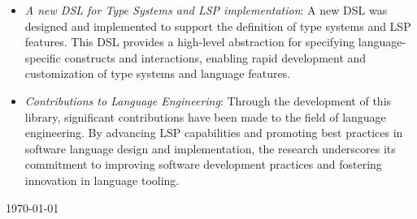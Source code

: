 \documentclass{adapt-lab}
\begin{document}
\begin{itemize}
    \item \textit{A new DSL for Type Systems and LSP implementation}: A new DSL was designed and implemented to support the definition of type systems and LSP features. This DSL provides a high-level abstraction for specifying language-specific constructs and interactions, enabling rapid development and customization of type systems and language features.
    \item \textit{Contributions to Language Engineering}: Through the development of this library, significant contributions have been made to the field of language engineering. By advancing LSP capabilities and promoting best practices in software language design and implementation, the research underscores its commitment to improving software development practices and fostering innovation in language tooling.
\end{itemize}


\begingroup
\let\clearpage\relax


\endgroup

\nocite{Cazzola20}
\nocite{Cazzola21b, Cazzola15f}
\nocite{Leduc20}
\nocite{Cazzola15c, Cazzola14c}
\nocite{Cazzola15f, Cazzola21b}
\nocite{Fowler10}
\nocite{Bettini13b}
\nocite{Barros22}
\nocite{Bunder19a}
\nocite{Rodriguez-Echeverria18a}
\nocite{Cazzola20}
\nocite{Rodriguez-Echeverria18}
\nocite{Cazzola23d, Cazzola20}
\nocite{Cazzola15f}
\nocite{Cazzola15f}
\nocite{Cazzola16, Cazzola16i, Cazzola15f}
\nocite{Haugen08, Cazzola14e, White09}
\nocite{Wende09}
\nocite{Cazzola15c, Cazzola14c}
\nocite{Cazzola19}

\vspace*{\fill}
\begin{flushright}
    \today %
\end{flushright}

%
% 
% 
\end{document}
